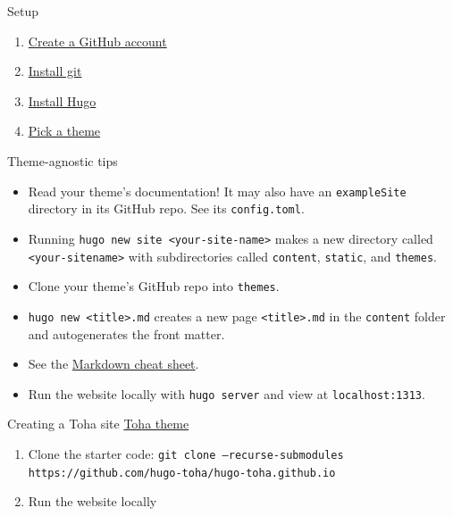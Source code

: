 \documentclass{beamer}
\begin{document}
\begin{frame}{Setup}
	\begin{enumerate}
		\item \href{https://github.com/join}{Create a GitHub account} \pause
		\item \href{https://git-scm.com/downloads}{Install git} \pause
		\item \href{https://gohugo.io/getting-started/installing/}{Install Hugo} \pause
		\item \href{https://themes.gohugo.io/tags/portfolio/}{Pick a theme}
	\end{enumerate}
\end{frame}

\begin{frame}{Theme-agnostic tips}
	\begin{itemize}
		\item Read your theme's documentation! It may also have an \texttt{exampleSite} directory in its GitHub repo. See its \texttt{config.toml}. \pause
		\item Running \texttt{hugo new site <your-site-name>} makes a new directory called \texttt{<your-sitename>} with subdirectories called \texttt{content}, \texttt{static}, and \texttt{themes}. \pause
		\item Clone your theme's GitHub repo into \texttt{themes}. \pause
		\item \texttt{hugo new <title>.md} creates a new page \texttt{<title>.md} in the \texttt{content} folder and autogenerates the front matter. \pause
		\item See the \href{https://github.com/adam-p/markdown-here/wiki/Markdown-Cheatsheet}{Markdown cheat sheet}. \pause
		\item Run the website locally with \texttt{hugo server} and view at \texttt{localhost:1313}.
	\end{itemize}
\end{frame}

\begin{frame}{Creating a Toha site}
	\href{https://themes.gohugo.io/toha/}{Toha theme} \pause
	\bigbreak
	\begin{enumerate}
		\item Clone the starter code: \texttt{git clone --recurse-submodules https://github.com/hugo-toha/hugo-toha.github.io} \pause
		\item Run the website locally
	\end{enumerate}
\end{frame}
\end{document}
